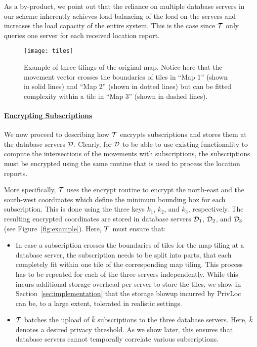 \documentclass{llncs}
\newcommand\sol{{\sf PrivLoc}}
\begin{document}
As a by-product, we point out that the reliance on multiple database servers
in our scheme inherently achieves load balancing of the load on the servers and increases the load capacity of the entire system.
This is the case since $\cal T$ only queries one server for each received location report.


\begin{figure}[tb]
	\centering
		\texttt{[image: tiles]}
		\caption{Example of three tilings of the original map. Notice here that the movement vector crosses the boundaries of tiles in ``Map 1'' (shown in solid lines) and ``Map 2'' (shown in dotted lines) but can be fitted complexity within a tile in ``Map 3'' (shown in dashed lines).}
	\label{fig:tiles}
\end{figure}




\paragraph{\underline{Encrypting Subscriptions}\\}

We now proceed to describing how $\cal T$ encrypts subscriptions and stores them at the database servers $\cal D$. Clearly, for $\cal D$ to be able to use existing functionality to compute the intersections of the movements with subscriptions, the subscriptions must be encrypted using the same routine that is used to process the location reports.

More specifically, $\cal T$ uses the {\sf encrypt} routine to encrypt the north-east and the south-west coordinates which define the minimum bounding box for each subscription.
This is done using the three keys $k_1$, $k_2$, and $k_3$, respectively. The resulting encrypted coordinates are stored in database servers ${\cal D}_1$, ${\cal D}_2$, and ${\cal D}_3$ (see Figure~\ref{fig:example}).
Here, $\cal T$ must ensure that:
\begin{itemize}
	\item In case a subscription crosses the boundaries of tiles for the map tiling at a database server, the subscription needs to be split into parts, that each completely fit within one tile of the corresponding map tiling. This process
has to be repeated for each of the three servers independently. While this incurs additional storage overhead per server to store the tiles, we show in Section~\ref{sec:implementation} that the storage blowup incurred by \sol{}
can be, to a large extent, tolerated in realistic settings.\item $\cal T$ batches the upload of $\bar{k}$ subscriptions to the three database servers. Here, $\bar{k}$ denotes a desired privacy threshold. As we show later, this ensures that database servers cannot temporally correlate various subscriptions.
\end{itemize}
\end{document}
